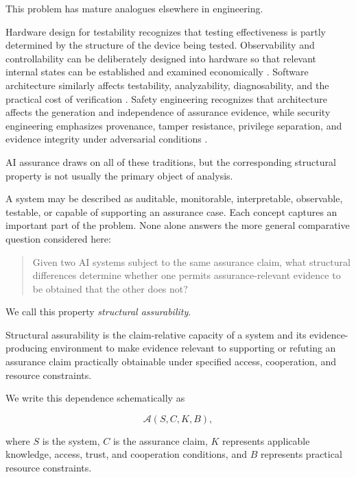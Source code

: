 This problem has mature analogues elsewhere in engineering.

Hardware design for testability recognizes that testing effectiveness is partly determined by the structure of the device being tested.
Observability and controllability can be deliberately designed into hardware so that relevant internal states
can be established and examined economically \cite{abramovici1990digitaltesting,williams1983testability}.
Software architecture similarly affects testability, analyzability, diagnosability, and the practical cost of
verification \cite{bass2021softwarearchitecture,clements2002evaluating,kazman2000atam}.
Safety engineering recognizes that architecture affects the generation and independence of assurance evidence,
while security engineering emphasizes provenance, tamper resistance, privilege separation, and evidence integrity
under adversarial conditions \cite{saeARP4754A,rtcaDO178C,saltzer1975protection,anderson2020security}.

AI assurance draws on all of these traditions, but the corresponding structural property is not usually the primary object of analysis.

A system may be described as auditable, monitorable, interpretable, observable, testable, or capable of supporting an assurance case.
Each concept captures an important part of the problem.
None alone answers the more general comparative question considered here:

\begin{quote}
  Given two AI systems subject to the same assurance claim, what structural differences determine
  whether one permits assurance-relevant evidence to be obtained that the other does not?
\end{quote}

We call this property \emph{structural assurability}.

Structural assurability is the claim-relative capacity of a system and its evidence-producing environment
to make evidence relevant to supporting or refuting an assurance claim practically obtainable
under specified access, cooperation, and resource constraints.

We write this dependence schematically as

\begin{equation}
  \mathcal{A}(S,C,K,B),
\end{equation}

where \(S\) is the system, \(C\) is the assurance claim, \(K\) represents applicable knowledge,
access, trust, and cooperation conditions,
and \(B\) represents practical resource constraints.

